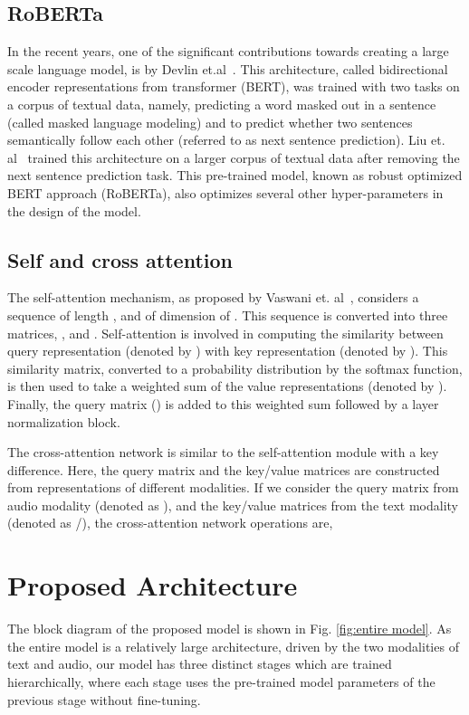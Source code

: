 \documentclass[lettersize,journal]{IEEEtran}
\begin{document}
\subsection{RoBERTa}
In the recent years, one of the significant contributions towards creating a large scale language model, is by Devlin et.al~\cite{devlin2019bert}. This architecture, called bidirectional encoder representations from transformer (BERT), was trained with two tasks on a corpus of textual data, namely, predicting a word masked out in a sentence (called masked language modeling) and to predict whether two sentences semantically follow each other (referred to as next sentence prediction). Liu et. al~\cite{liu2019roberta} trained this architecture on a larger corpus of textual data after removing the next sentence prediction task. This pre-trained model, known as robust optimized BERT approach (RoBERTa), also optimizes several other hyper-parameters in the design of the model. 

\subsection{Self and cross attention}\label{sec:self_cross_attn} 
The self-attention mechanism, as proposed by Vaswani et. al~\cite{vaswani2017attention}, considers a sequence of length , and of dimension of . This sequence is converted into three matrices, ,  and . Self-attention is involved in computing the similarity between query representation (denoted by ) with key representation (denoted by ). This similarity matrix, converted to a probability distribution by the softmax function, is then used to take a weighted sum of the value representations (denoted by ). Finally, the query matrix () is added to this weighted sum followed by a layer normalization block.
    
\par
The cross-attention network is similar to the self-attention module with a key difference. Here, the query matrix and the key/value matrices are constructed from representations of different modalities. If we consider the query matrix from audio modality (denoted as ), and the key/value matrices from the text modality (denoted as /), the cross-attention network operations are, 


\section{Proposed Architecture}\label{proposal}

The block diagram of the proposed model is shown in Fig. \ref{fig:entire model}. As the entire model is a relatively large architecture, driven by the two modalities of text and audio, our model has three distinct stages which are trained hierarchically, where each stage uses the pre-trained model parameters of the previous stage without fine-tuning. 
\end{document}
